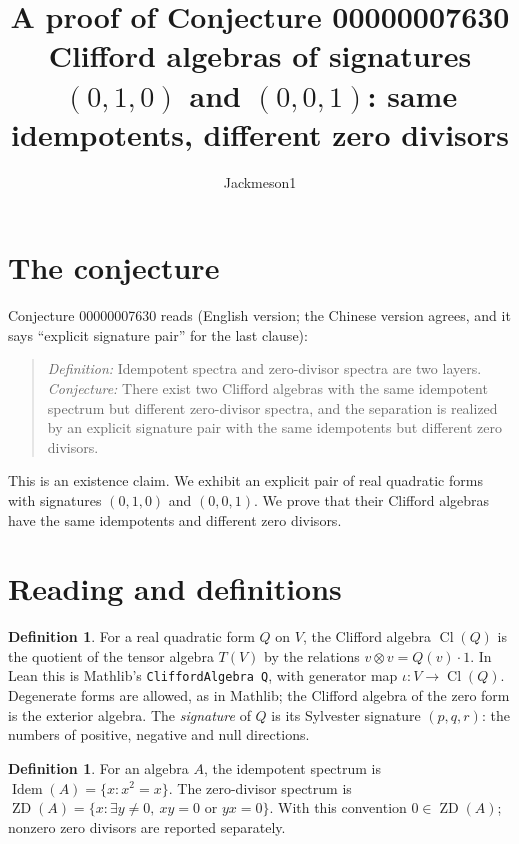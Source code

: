 \documentclass[11pt]{article}
\title{A proof of Conjecture 00000007630\\[2pt]
\large Clifford algebras of signatures $(0,1,0)$ and $(0,0,1)$: same idempotents, different zero divisors}
\author{Jackmeson1}
\date{}
\theoremstyle{definition}
\newtheorem{definition}[theorem]{Definition}
\theoremstyle{remark}
\renewcommand{\_}{\oldus\allowbreak}
\newcommand{\Cl}{\operatorname{Cl}}
\newcommand{\Idem}{\operatorname{Idem}}
\newcommand{\ZD}{\operatorname{ZD}}
\begin{document}
\sloppy
\maketitle

\section{The conjecture}

Conjecture 00000007630 reads (English version; the Chinese version agrees, and it says
``explicit signature pair'' for the last clause):

\begin{quote}
\emph{Definition:} Idempotent spectra and zero-divisor spectra are two layers.
\emph{Conjecture:} There exist two Clifford algebras with the same idempotent spectrum but different
zero-divisor spectra, and the separation is realized by an explicit signature pair with the same
idempotents but different zero divisors.
\end{quote}

This is an existence claim. We exhibit an explicit pair of real quadratic forms with signatures
$(0,1,0)$ and $(0,0,1)$. We prove that their Clifford algebras have the same idempotents and
different zero divisors.

\section{Reading and definitions}

\begin{definition}
For a real quadratic form $Q$ on $V$, the Clifford algebra $\Cl(Q)$ is the quotient of the tensor
algebra $T(V)$ by the relations $v\otimes v=Q(v)\cdot 1$. In Lean this is Mathlib's
\texttt{CliffordAlgebra Q}, with generator map $\iota\colon V\to\Cl(Q)$. Degenerate forms are
allowed, as in Mathlib; the Clifford algebra of the zero form is the exterior algebra. The
\emph{signature} of $Q$ is its Sylvester signature $(p,q,r)$: the numbers of positive, negative
and null directions.
\end{definition}

\begin{definition}
For an algebra $A$, the idempotent spectrum is $\Idem(A)=\{x: x^2=x\}$. The zero-divisor spectrum
is $\ZD(A)=\{x:\exists y\neq0,\ xy=0 \text{ or } yx=0\}$. With this convention $0\in\ZD(A)$; nonzero
zero divisors are reported separately.
\end{definition}
\end{document}
